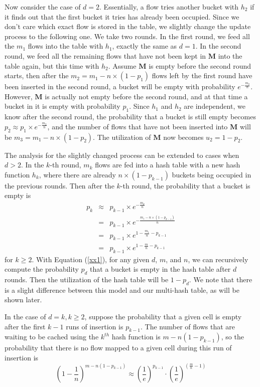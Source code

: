 Now consider the case of $d=2$. 
Essentially, a flow tries another bucket with $h_2$ if it finds out 
that the first bucket it tries has already been occupied. 
Since we don't care which exact flow is stored in the table, 
we slightly change the update process to the following one.
We take two rounds. In the first round, 
we feed all the $m_1$ flows into the table with $h_1$, exactly the same as $d=1$.
In the second round, we feed all the remaining flows that have not been kept in $\mathbf{M}$ into the table again, 
but this time with $h_2$. 
Assume $\mathbf{M}$ is empty before the second round starts, 
then after the $m_2=m_1-n\times(1-p_1)$ flows left by the first round have been inserted in the second round, 
a bucket will be empty with probability $e^{-\frac{m_2}{n}}$. 
However, $\mathbf{M}$ is actually not empty before the second round, 
and at that time a bucket in it is empty with probability $p_1$.
Since $h_1$ and $h_2$ are independent, we know after the second round, 
the probability that a bucket is still empty becomes $p_2 \approx p_1 \times e^{-\frac{m_2}{n}}$, 
and the number of flows that have not been inserted into $\mathbf{M}$ will be $m_3=m_1-n\times(1-p_2)$.
The utilization of $\mathbf{M}$ now becomes $u_2=1-p_2$.

The analysis for the slightly changed process can be extended to cases when $d>2$. 
In the $k$-th round, $m_k$ flows are fed into a hash table with a new hash function $h_k$, 
where there are already $n \times (1-p_{k-1})$ buckets being occupied in the previous rounds. 
Then after the $k$-th round, the probability that a bucket is empty is
\begin{eqnarray}
\label{xx1}
p_k & \approx &p_{k-1} \times e^{-\frac{m_k}{n}} \nonumber \\
& = & p_{k-1} \times e^{-\frac{m_1-n \times (1-p_{k-1})}{n}} \nonumber \\
& = & p_{k-1} \times e^{1-\frac{m_1}{n}-p_{k-1}} \nonumber \\
& = & p_{k-1} \times e^{1-\frac{m}{n}-p_{k-1}}
\end{eqnarray}
for $k \ge 2$. With Equation (\ref{xx1}), for any given $d$, $m$, and $n$, 
we can recursively compute the probability $p_d$ that a bucket is empty in the hash table after $d$ rounds. 
Then the utilization of the hash table will be $1-p_d$. 
We note that there is a slight difference between this model and our multi-hash table, as will be shown later.

\iffalse
In the case of $d=k, k\ge 2$, suppose the probability that a given cell is empty after the first $k-1$ runs of insertion is $p_{k-1}$. The number of flows that are waiting to be cached using the $k^{th}$ hash function is $m - n(1-p_{k-1})$, so the probability that there is no flow mapped to a given cell during this run of insertion is
\begin{equation}\label{equation3}
(1 - \frac{1}{n})^{m - n(1- p_{k-1})}\approx (\frac{1}{e})^{p_{k-1}}\cdot(\frac{1}{e})^{(\frac{m}{n} - 1)}
\end{equation}


